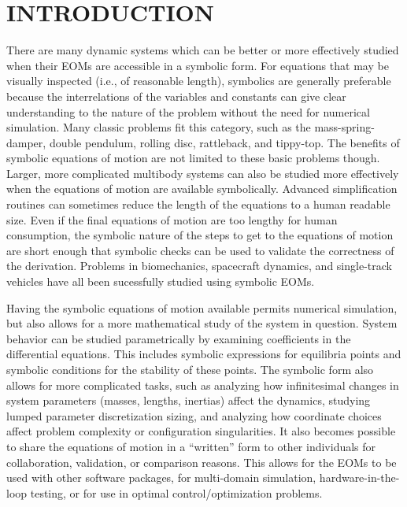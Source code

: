 \documentclass[twocolumn,10pt]{asme2e}
\begin{document}
\section*{INTRODUCTION}
There are many dynamic systems which can be better or more effectively studied
when their EOMs are accessible in a symbolic form. For equations that may be
visually inspected (i.e., of reasonable length), symbolics are generally
preferable because the interrelations of the variables and constants can give
clear understanding to the nature of the problem without the need for numerical
simulation. Many classic problems fit this category, such as the
mass-spring-damper, double pendulum, rolling disc, rattleback, and tippy-top.
The benefits of symbolic equations of motion are not limited to these basic
problems though. Larger, more complicated multibody systems can also be studied
more effectively when the equations of motion are available symbolically.
Advanced simplification routines can sometimes reduce the length of the
equations to a human readable size. Even if the final equations of motion are
too lengthy for human consumption, the symbolic nature of the steps to get to
the equations of motion are short enough that symbolic checks can be used to
validate the correctness of the derivation. Problems in biomechanics,
spacecraft dynamics, and single-track vehicles have all been sucessfully
studied using symbolic EOMs.

Having the symbolic equations of motion available permits numerical simulation,
but also allows for a more mathematical study of the system in question. System
behavior can be studied parametrically by examining coefficients in the
differential equations. This includes symbolic expressions for equilibria
points and symbolic conditions for the stability of these points. The symbolic
form also allows for more complicated tasks, such as analyzing how
infinitesimal changes in system parameters (masses, lengths, inertias) affect
the dynamics, studying lumped parameter discretization sizing, and analyzing
how coordinate choices affect problem complexity or configuration
singularities. It also becomes possible to share the equations of motion in a
``written'' form to other individuals for collaboration, validation, or
comparison reasons. This allows for the EOMs to be used with other software
packages, for multi-domain simulation, hardware-in-the-loop testing, or for use
in optimal control/optimization problems.
\end{document}
